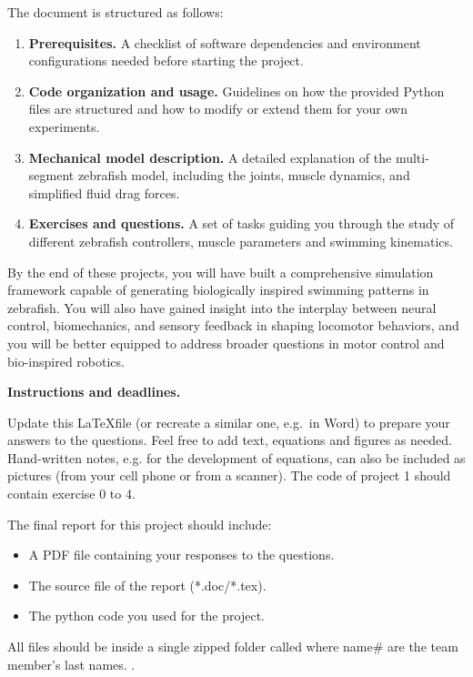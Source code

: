 \documentclass{cmc}
\begin{document}
The document is structured as follows:
\begin{enumerate}
  \item \textbf{Prerequisites.} A checklist of software dependencies and environment configurations needed before starting the project.
  \item \textbf{Code organization and usage.} Guidelines on how the provided Python files are structured and how to modify or extend them for your own experiments.
  \item \textbf{Mechanical model description.} A detailed explanation of the multi-segment zebrafish model, including the joints, muscle dynamics, and simplified fluid drag forces.
  \item \textbf{Exercises and questions.} A set of tasks guiding you through the study of different zebrafish controllers, muscle parameters and swimming kinematics.
\end{enumerate}

\noindent
By the end of these projects, you will have built a comprehensive simulation framework capable of generating biologically inspired swimming patterns in zebrafish. You will also have gained insight into the interplay between neural control, biomechanics, and sensory feedback in shaping locomotor behaviors, and you will be better equipped to address broader questions in motor control and bio-inspired robotics.

\noindent
\textbf{Instructions and deadlines.}

Update this \LaTeX \space file (or recreate a similar one, e.g.\ in Word) to prepare your answers to the questions. Feel free to add text, equations and figures as needed. Hand-written notes, e.g. for the development of equations, can also be included as pictures (from your cell phone or from a scanner). The code of project 1 should contain exercise 0 to 4.

The final report for this project should include:

\begin{itemize}
    \item A PDF file containing your responses to the questions.
    \item The source file of the report (*.doc/*.tex).
    \item The python code you used for the project.
\end{itemize}

All files should be inside a single zipped folder called  where name\# are the team member's last names. .
\end{document}
